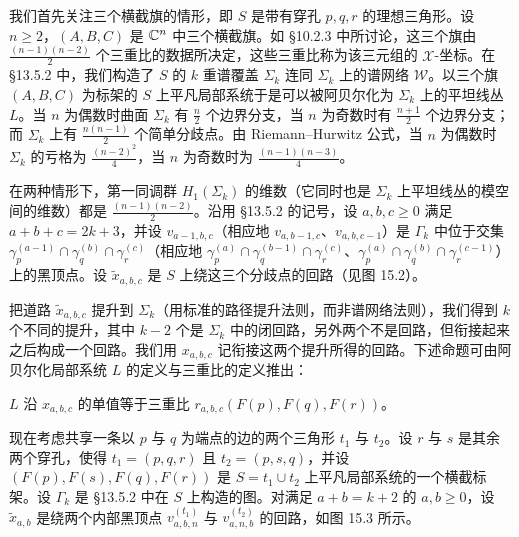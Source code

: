 我们首先关注三个横截旗的情形，即 $S$ 是带有穿孔 $p,q,r$ 的理想三角形。设 $n\ge2$，$(A,B,C)$ 是 $\mathbb{C}^n$ 中三个横截旗。如 §10.2.3 中所讨论，这三个旗由 $\frac{(n-1)(n-2)}{2}$ 个三重比的数据所决定，这些三重比称为该三元组的 $\mathcal{X}$-坐标。在 §13.5.2 中，我们构造了 $S$ 的 $k$ 重谱覆盖 $\Sigma_k$ 连同
$\Sigma_k$ 上的谱网络 $\mathcal{W}$。以三个旗 $(A,B,C)$ 为标架的 $S$ 上平凡局部系统于是可以被阿贝尔化为 $\Sigma_k$ 上的平坦线丛 $L$。当 $n$ 为偶数时曲面 $\Sigma_k$ 有 $\frac{n}{2}$ 个边界分支，当 $n$ 为奇数时有 $\frac{n+1}{2}$ 个边界分支；而 $\Sigma_k$ 上有 $\frac{n(n-1)}{2}$ 个简单分歧点。由 Riemann–Hurwitz 公式，当 $n$ 为偶数时 $\Sigma_k$ 的亏格为 $\frac{(n-2)^2}{4}$，当 $n$ 为奇数时为 $\frac{(n-1)(n-3)}{4}$。

在两种情形下，第一同调群 $H_1(\Sigma_k)$ 的维数（它同时也是 $\Sigma_k$ 上平坦线丛的模空间的维数）都是 $\frac{(n-1)(n-2)}{2}$。沿用 §13.5.2 的记号，设 $a,b,c\ge0$ 满足 $a+b+c=2k+3$，并设 $v_{a-1,b,c}$（相应地 $v_{a,b-1,c}$、$v_{a,b,c-1}$）是 $\Gamma_k$ 中位于交集 $\gamma_p^{(a-1)}\cap\gamma_q^{(b)}\cap\gamma_r^{(c)}$（相应地 $\gamma_p^{(a)}\cap\gamma_q^{(b-1)}\cap\gamma_r^{(c)}$、$\gamma_p^{(a)}\cap\gamma_q^{(b)}\cap\gamma_r^{(c-1)}$）上的黑顶点。设 $\tilde{x}_{a,b,c}$ 是 $S$ 上绕这三个分歧点的回路（见图 15.2）。


把道路 $\tilde{x}_{a,b,c}$ 提升到 $\Sigma_k$（用标准的路径提升法则，而非谱网络法则），我们得到 $k$ 个不同的提升，其中 $k-2$ 个是 $\Sigma_k$ 中的闭回路，另外两个不是回路，但衔接起来之后构成一个回路。我们用 $x_{a,b,c}$ 记衔接这两个提升所得的回路。下述命题可由阿贝尔化局部系统 $L$ 的定义与三重比的定义推出：

\begin{proposition}[15.3]
$L$ 沿 $x_{a,b,c}$ 的单值等于三重比 $r_{a,b,c}(F(p),F(q),F(r))$。
\end{proposition}

现在考虑共享一条以 $p$ 与 $q$ 为端点的边的两个三角形 $t_1$ 与 $t_2$。设 $r$ 与 $s$ 是其余两个穿孔，使得 $t_1=(p,q,r)$ 且 $t_2=(p,s,q)$，并设 $(F(p),F(s),F(q),F(r))$ 是 $S=t_1\cup t_2$ 上平凡局部系统的一个横截标架。设 $\Gamma_k$ 是 §13.5.2 中在 $S$ 上构造的图。对满足 $a+b=k+2$ 的 $a,b\ge0$，设 $\tilde{x}_{a,b}$ 是绕两个内部黑顶点 $v^{(t_1)}_{a,b,n}$ 与 $v^{(t_2)}_{a,n,b}$ 的回路，如图 15.3 所示。

